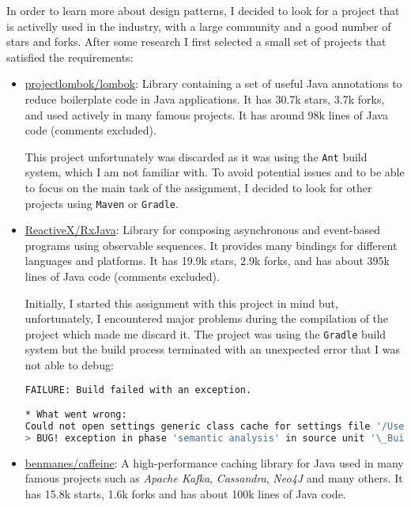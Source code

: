 \documentclass[a4paper, 11pt]{article}
\begin{document}
In order to learn more about design patterns, I decided to look for a project that is activelly used in the industry, with a large community and a good number of stars and forks. After some research I first selected a small set of projects that satisfied the requirements:

\begin{itemize}
	\item \href{https://github.com/projectlombok/lombok}{projectlombok/lombok}: Library containing a set of useful Java annotations to reduce boilerplate code in Java applications. It has 30.7k stars, 3.7k forks, and used actively in many famous projects. It has around 98k lines of Java code (comments excluded).

	      This project unfortunately was discarded as it was using the \texttt{Ant} build system, which I am not familiar with. To avoid potential issues and to be able to focus on the main task of the assignment, I decided to look for other projects using \texttt{Maven} or \texttt{Gradle}.

	\item \href{https://github.com/ReactiveX/RxJava}{ReactiveX/RxJava}: Library for composing asynchronous and event-based programs using observable sequences. It provides many bindings for different languages and platforms. It has 19.9k stars, 2.9k forks, and has about 395k lines of Java code (comments excluded).

	      Initially, I started this assignment with this project in mind but, unfortunately, I encountered major problems during the compilation of the project which made me discard it. The project was using the \texttt{Gradle} build system but the build process terminated with an unexpected error that I was not able to debug:

	      \begin{lstlisting}[language=bash, caption={Error during compilation of RxJava project}, breaklines=true, captionpos=b]
FAILURE: Build failed with an exception.

* What went wrong:
Could not open settings generic class cache for settings file '/Users/lucadibello/Developer/RxJava/settings.gradle' (/Users/lucadibello/.gradle/caches/7.6.4/scripts/7qrwiegia3vs821g20py0pu68).
> BUG! exception in phase 'semantic analysis' in source unit '\_BuildScript\_' Unsupported class file major version 67
        \end{lstlisting}

	\item \href{https://github.com/ben-manes/caffeine}{benmanes/caffeine}: A high-performance caching library for Java used in many famous projects such as \textit{Apache Kafka}, \textit{Cassandra}, \textit{Neo4J} and many others. It has 15.8k starts, 1.6k forks and has about 100k lines of Java code.


\end{itemize}
\end{document}
